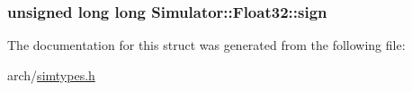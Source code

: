 \hypertarget{struct_simulator_1_1_float32_abf8bcfd04c3da1e1bcdb82d3b93caf42}{
\subsubsection[{sign}]{\setlength{\rightskip}{0pt plus 5cm}unsigned long long Simulator\+::\+Float32\+::sign}}\label{struct_simulator_1_1_float32_abf8bcfd04c3da1e1bcdb82d3b93caf42}


The documentation for this struct was generated from the following file\+:\begin{DoxyCompactItemize}
\item 
arch/\hyperlink{simtypes_8h}{simtypes.\+h}\end{DoxyCompactItemize}
